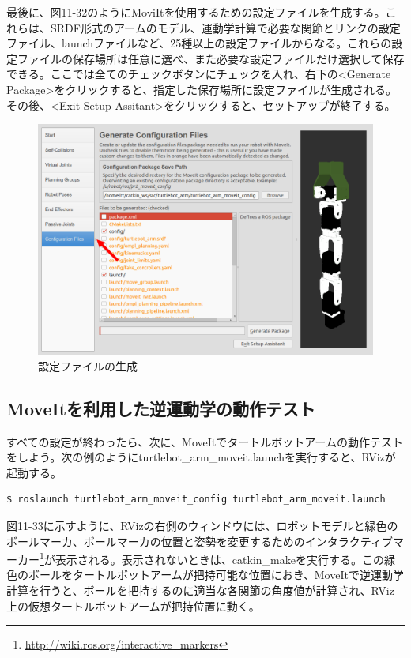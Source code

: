 最後に、図11-32のようにMoviItを使用するための設定ファイルを生成する。これらは、SRDF形式のアームのモデル、運動学計算で必要な関節とリンクの設定ファイル、launchファイルなど、25種以上の設定ファイルからなる。これらの設定ファイルの保存場所は任意に選べ、また必要な設定ファイルだけ選択して保存できる。ここでは全てのチェックボタンにチェックを入れ、右下の<Generate Package>をクリックすると、指定した保存場所に設定ファイルが生成される。その後、<Exit Setup Assitant>をクリックすると、セットアップが終了する。

\begin{figure}[htp]
  \centering
  \includegraphics[width=12cm]{pictures/chapter11/pic_11_32.png}
  \caption{設定ファイルの生成}
\end{figure}

\subsection{MoveItを利用した逆運動学の動作テスト}

すべての設定が終わったら、次に、MoveItでタートルボットアームの動作テストをしよう。次の例のようにturtlebot\_arm\_moveit.launchを実行すると、RVizが起動する。

\begin{lstlisting}[language=ROS]
$ roslaunch turtlebot_arm_moveit_config turtlebot_arm_moveit.launch
\end{lstlisting}

図11-33に示すように、RVizの右側のウィンドウには、ロボットモデルと緑色のボールマーカ、ボールマーカの位置と姿勢を変更するためのインタラクティブマーカー\footnote{\url{http://wiki.ros.org/interactive\_markers}}が表示される。表示されないときは、catkin\_makeを実行する。この緑色のボールをタートルボットアームが把持可能な位置におき、MoveItで逆運動学計算を行うと、ボールを把持するのに適当な各関節の角度値が計算され、RViz上の仮想タートルボットアームが把持位置に動く。


